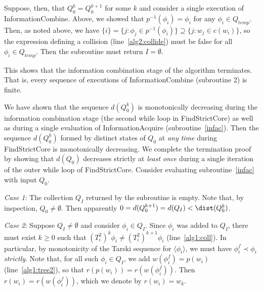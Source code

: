 \documentclass[11pt,reqno]{amsart}
\theoremstyle{definition}
\numberwithin{equation}{section}
\newcommand{\inv}{^{-1}}
\newcommand{\lag}{\langle}
\newcommand{\rag}{\rangle}
\newcommand{\pre}{\phi}
\newcommand{\pe}{\prec}
\newcommand{\acto}{Q_0}
\newcommand{\actok}{Q_0^k}
\newcommand{\actc}{Q_I}
\newcommand{\actt}{Q_{temp}}
\newcommand{\disto}{d}
\begin{document}
Suppose, then, that $\actok = \acto^{k+1}$ for some $k$ and consider a single execution of InformationCombine. 
Above, we showed that $p\inv(\pre_i) = \pre_i$ for any $\pre_i \in \actt$.
Then, as noted above, we have $\{i\} = \{j: \pre_j \in p\inv(\pre_i)\} \supseteq \{j: w_j \in c(w_i)\}$, so the expression defining a collision (line~\ref{alg2:collide}) must be false for all $\pre_i \in \actt$. Then the subroutine must return $I = \emptyset$. 

This shows that the information combination stage of the algorithm terminates.
That is, every sequence of executions of InformationCombine (subroutine 2) is finite.

We have shown that the sequence $\disto(\actok)$ is monotonically decreasing during the information combination stage (the second while loop in FindStrictCore) as well as during a single evaluation of InformationAcquire (subroutine~\ref{infac}).
Then the sequence $\disto(\actok)$ formed by distinct states of $\acto$ at \emph{any time} during FindStrictCore is monotonically decreasing.  
We complete the termination proof by showing that $\disto(\acto)$ decreases strictly at \emph{least once} during a single iteration of the outer while loop of FindStrictCore.
Consider evaluating subroutine~\ref{infac} with input $\acto$. 

\emph{Case 1}: The collection $\actc$ returned by the subroutine is empty.
Note that, by inspection, $\acto \not = \emptyset$. 
Then apparently $0 = \disto(\acto^{k+1}) = \disto(\actc) < \dist(\actok)$. 

\emph{Case 2}: Suppose $\actc \not = \emptyset$ and consider $\pre_i \in \actc$.
Since $\pre_i$ was added to $\actc$, there must exist $k \geq 0$ such that $(T_i^2)^k \pre_i \not = (T_i^2)^{k+1} \pre_i$ (line~\ref{alg1:coll}).  
In particular, by monotonicity of the Tarski sequence for $\lag \pre_i \rag$, we must have $\pre_i^f \pe \pre_i$ \emph{strictly}.
Note that, for all such $\pre_i \in \actc$, we add $w(\pre_i^f) = p(w_i)$ (line~\ref{alg1:tree2}), so that $r(p(w_i)) = r(w(\pre_i^f))$.
Then $r(w_i) = r(w(\pre_i^f))$, which we denote by $r(w_i) = w_k$.
\end{document}

